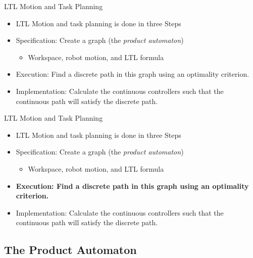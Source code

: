 \documentclass{beamer}
\begin{document}
\begin{frame}{LTL Motion and Task Planning}
	\begin{itemize}	
	\item {
		LTL Motion and task planning is done in three Steps \cite{belta07}
		\pause
	}
	\item<2->{
		Specification: Create a graph (the \textit{product automaton}) 
		\begin{itemize}
			\item Workspace, robot motion, and LTL formula
		\end{itemize}
	}
	\item<3->{
		Execution: Find a discrete path in this graph using an optimality criterion.
	}
	\item<4->{
		Implementation: Calculate the continuous controllers such that the continuous path will satisfy the discrete path.
	}
	\end{itemize}	
	
\end{frame}

\begin{frame}{LTL Motion and Task Planning}
	\begin{itemize}	
	\item {
		LTL Motion and task planning is done in three Steps \cite{belta07}

	}
	\item{
		Specification: Create a graph (the \textit{product automaton}) 
		\begin{itemize}
			\item Workspace, robot motion, and LTL formula
		\end{itemize}
	}
	\item{
			\textbf{\color{red}Execution: Find a discrete path in this graph using an optimality criterion.}
	}
	\item{
		Implementation: Calculate the continuous controllers such that the continuous path will satisfy the discrete path.
	}
	\end{itemize}	
	
\end{frame}

\subsection{The Product Automaton}
\end{document}
